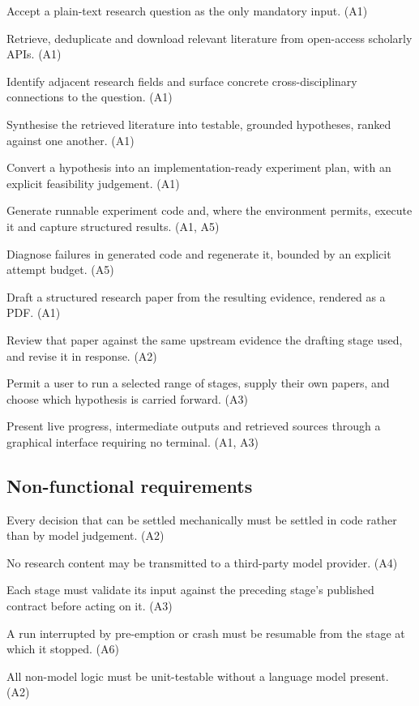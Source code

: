 \begin{description}[style=unboxed,leftmargin=0pt,itemsep=0.2em,font=\normalfont\bfseries]
  \item[FR1] Accept a plain-text research question as the only mandatory input. \hfill(A1)
  \item[FR2] Retrieve, deduplicate and download relevant literature from open-access
    scholarly APIs. \hfill(A1)
  \item[FR3] Identify adjacent research fields and surface concrete cross-disciplinary
    connections to the question. \hfill(A1)
  \item[FR4] Synthesise the retrieved literature into testable, grounded hypotheses, ranked
    against one another. \hfill(A1)
  \item[FR5] Convert a hypothesis into an implementation-ready experiment plan, with an
    explicit feasibility judgement. \hfill(A1)
  \item[FR6] Generate runnable experiment code and, where the environment permits, execute it
    and capture structured results. \hfill(A1, A5)
  \item[FR7] Diagnose failures in generated code and regenerate it, bounded by an explicit
    attempt budget. \hfill(A5)
  \item[FR8] Draft a structured research paper from the resulting evidence, rendered as a PDF.
    \hfill(A1)
  \item[FR9] Review that paper against the same upstream evidence the drafting stage used, and
    revise it in response. \hfill(A2)
  \item[FR10] Permit a user to run a selected range of stages, supply their own papers, and
    choose which hypothesis is carried forward. \hfill(A3)
  \item[FR11] Present live progress, intermediate outputs and retrieved sources through a
    graphical interface requiring no terminal. \hfill(A1, A3)
\end{description}

\subsection{Non-functional requirements}

\begin{description}[style=unboxed,leftmargin=0pt,itemsep=0.2em,font=\normalfont\bfseries]
  \item[NFR1] Every decision that can be settled mechanically must be settled in code rather
    than by model judgement. \hfill(A2)
  \item[NFR2] No research content may be transmitted to a third-party model provider.
    \hfill(A4)
  \item[NFR3] Each stage must validate its input against the preceding stage's published
    contract before acting on it. \hfill(A3)
  \item[NFR4] A run interrupted by pre-emption or crash must be resumable from the stage at
    which it stopped. \hfill(A6)
  \item[NFR5] All non-model logic must be unit-testable without a language model present.
    \hfill(A2)
\end{description}

